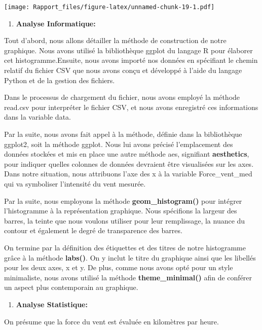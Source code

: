 \documentclass[
]{article}
\providecommand{\tightlist}{%
  \setlength{\itemsep}{0pt}\setlength{\parskip}{0pt}}
\begin{document}
\texttt{[image: Rapport\_files/figure-latex/unnamed-chunk-19-1.pdf]}

\begin{enumerate}
\def\labelenumi{\arabic{enumi}.}
\tightlist
\item
  \textbf{Analyse Informatique:}
\end{enumerate}

Tout d'abord, nous allons détailler la méthode de construction de notre
graphique. Nous avons utilisé la bibliothèque ggplot du langage R pour
élaborer cet histogramme.Ensuite, nous avons importé nos données en
spécifiant le chemin relatif du fichier CSV que nous avons conçu et
développé à l'aide du langage Python et de la gestion des fichiers.

Dans le processus de chargement du fichier, nous avons employé la
méthode read.csv pour interpréter le fichier CSV, et nous avons
enregistré ces informations dans la variable data.

Par la suite, nous avons fait appel à la méthode, définie dans la
bibliothèque ggplot2, soit la méthode ggplot. Nous lui avons précisé
l'emplacement des données stockées et mis en place une autre méthode
aes, signifiant \textbf{aesthetics}, pour indiquer quelles colonnes de
données devraient être visualisées sur les axes. Dans notre situation,
nous attribuons l'axe des x à la variable Force\_vent\_med qui va
symboliser l'intensité du vent mesurée.

Par la suite, nous employons la méthode \textbf{geom\_histogram()} pour
intégrer l'histogramme à la représentation graphique. Nous spécifions la
largeur des barres, la teinte que nous voulons utiliser pour leur
remplissage, la nuance du contour et également le degré de transparence
des barres.

On termine par la définition des étiquettes et des titres de notre
histogramme grâce à la méthode \textbf{labs()}. On y inclut le titre du
graphique ainsi que les libellés pour les deux axes, x et y. De plus,
comme nous avons opté pour un style minimaliste, nous avons utilisé la
méthode \textbf{theme\_minimal()} afin de conférer un aspect plus
contemporain au graphique.

\begin{enumerate}
\def\labelenumi{\arabic{enumi}.}
\setcounter{enumi}{1}
\tightlist
\item
  \textbf{Analyse Statistique:}
\end{enumerate}

On présume que la force du vent est évaluée en kilomètres par heure.
\end{document}
